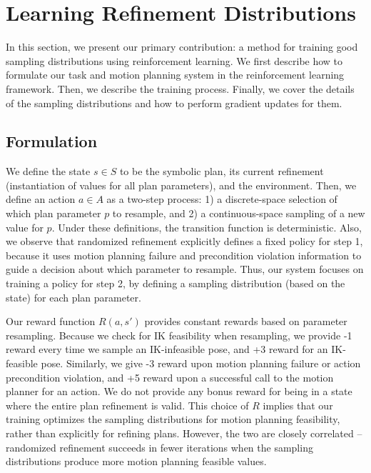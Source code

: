 \section{Learning Refinement Distributions}
In this section, we present our primary contribution: a method
for training good sampling distributions using reinforcement learning.
We first describe how to formulate our task and motion planning system
in the reinforcement learning framework. Then, we describe the training
process. Finally, we cover the details of the sampling distributions
and how to perform gradient updates for them.
\subsection{Formulation}
We define the state $s \in S$ to be the symbolic plan, its current refinement
(instantiation of values for all plan parameters), and the environment. Then, we define an action $a \in A$ as
a two-step process: 1) a discrete-space selection of which plan parameter $p$ to
resample, and 2) a continuous-space sampling of a new value for $p$. Under
these definitions, the transition function is deterministic. Also, we observe that
randomized refinement explicitly defines a fixed policy for
step 1, because it uses motion planning failure and precondition violation information
to guide a decision about which parameter to resample. Thus, our system focuses
on training a policy for step 2, by defining a sampling distribution (based on the
state) for each plan parameter.

Our reward function $R(a, s')$ provides constant rewards based on parameter resampling.
Because we check for IK feasibility when resampling, we provide -1 reward every
time we sample an IK-infeasible pose, and +3 reward for an IK-feasible pose.
Similarly, we give -3 reward upon motion planning failure or action precondition violation,
and +5 reward upon a successful call to the motion planner for an action. We do not
provide any bonus reward for being in a state where the entire plan refinement is valid.
This choice of $R$ implies that our training optimizes the sampling distributions for
motion planning feasibility, rather than explicitly for refining plans. However, the two are
closely correlated -- randomized refinement succeeds in fewer iterations when the sampling
distributions produce more motion planning feasible values.
